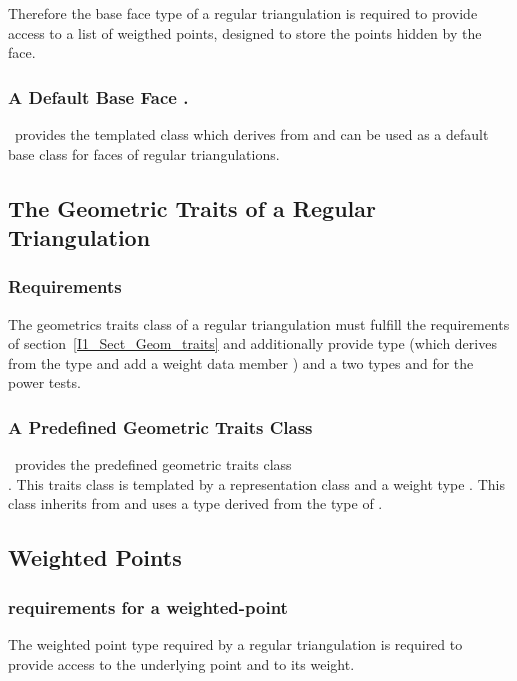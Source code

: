 Therefore the base face type of a regular triangulation
is required to provide access to a list of weigthed points,
designed to store the points hidden by the face.


\subsubsection{A Default Base Face .}
\cgal\ provides the templated class 
which derives from 
and can be used as a default base class for faces of regular triangulations.



\subsection{The Geometric Traits of a Regular Triangulation}

\subsubsection{Requirements}

The geometrics traits class of a regular triangulation
must fulfill the requirements of section~\ref{I1_Sect_Geom_traits}
and additionally provide  
 type (which derives from the type  
and add a weight data member )
and a two types  and 
for the power tests.


\subsubsection{A Predefined Geometric Traits Class}
\cgal\ provides the predefined geometric traits class \\
.
This traits class is templated by a representation class 
and a weight type .
This class inherits from
and uses a  type
derived from the type  of
.



\subsection{Weighted Points}

\subsubsection{requirements for a weighted-point}
The weighted point type  required by a regular triangulation
is required to provide access to the underlying  point and to its weight.

